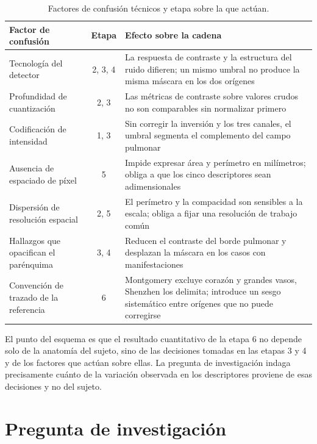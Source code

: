 \documentclass[12pt,a4paper]{article}
\begin{document}
\begin{table}[H]
\centering
\caption{Factores de confusión técnicos y etapa sobre la que actúan.}
\small
\begin{tabular}{@{}p{4.4cm}cp{7.6cm}@{}}
\toprule
\textbf{Factor de confusión} & \textbf{Etapa} & \textbf{Efecto sobre la cadena} \\
\midrule
Tecnología del detector & 2, 3, 4 & La respuesta de contraste y la estructura del ruido difieren; un mismo umbral no produce la misma máscara en los dos orígenes \\
\addlinespace
Profundidad de cuantización & 2, 3 & Las métricas de contraste sobre valores crudos no son comparables sin normalizar primero \\
\addlinespace
Codificación de intensidad & 1, 3 & Sin corregir la inversión y los tres canales, el umbral segmenta el complemento del campo pulmonar \\
\addlinespace
Ausencia de espaciado de píxel & 5 & Impide expresar área y perímetro en milímetros; obliga a que los cinco descriptores sean adimensionales \\
\addlinespace
Dispersión de resolución espacial & 2, 5 & El perímetro y la compacidad son sensibles a la escala; obliga a fijar una resolución de trabajo común \\
\addlinespace
Hallazgos que opacifican el parénquima & 3, 4 & Reducen el contraste del borde pulmonar y desplazan la máscara en los casos con manifestaciones \\
\addlinespace
Convención de trazado de la referencia & 6 & Montgomery excluye corazón y grandes vasos, Shenzhen los delimita; introduce un sesgo sistemático entre orígenes que no puede corregirse \\
\bottomrule
\end{tabular}
\end{table}

El punto del esquema es que el resultado cuantitativo de la etapa 6 no depende
solo de la anatomía del sujeto, sino de las decisiones tomadas en las etapas 3 y
4 y de los factores que actúan sobre ellas. La pregunta de investigación indaga
precisamente cuánto de la variación observada en los descriptores proviene de
esas decisiones y no del sujeto.



\section{Pregunta de investigación}
\end{document}
